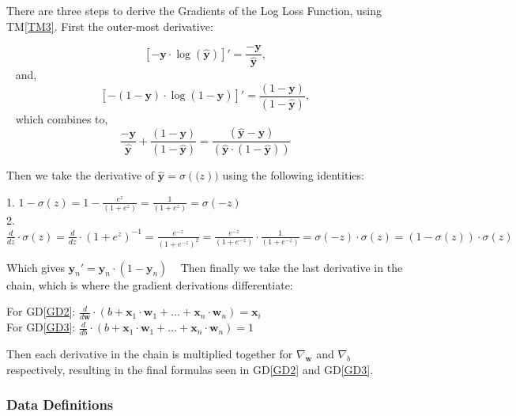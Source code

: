 \documentclass[12pt]{article}
\newcommand{\dref}[1]{GD\ref{#1}}
\newcommand{\tref}[1]{TM\ref{#1}}
\begin{document}
There are three steps to derive the Gradients of the Log Loss Function, using \tref{TM3}. First the outer-most derivative:
\begin{center}
  $$
    [-\mathbf{y} \cdot \log(\mathbf{\hat{y}})]' = \frac{-\mathbf{y}}{\mathbf{\hat{y}}},
  $$
  ~\newline
    and, 
    ~\newline
    $$
    [-(1 - \mathbf{y}) \cdot \log(1 - \mathbf{\hat{y}})]' = \frac{(1 - \mathbf{y})}{(1 - \mathbf{\hat{y}})}, 
    $$
    ~\newline
    which combines to,
    ~\newline
    $$
    \frac{-\mathbf{y}}{\mathbf{\hat{y}}} + \frac{(1 - \mathbf{y})}{(1 - \mathbf{\hat{y}})} = \frac{(\mathbf{\hat{y}} - \mathbf{y})}{(\mathbf{\hat{y}} \cdot (1 - \mathbf{\hat{y}}))}
    $$
\end{center}
Then we take the derivative of $\mathbf{\hat{y}} = \sigma(\mathbf(z))$ using the following identities:
\begin{center}
1. $ 1 - \sigma(z) = 1 - \frac{e^z}{(1 + e^z)} = \frac{1}{(1 + e^z)} = \sigma(-z)$\\
2.$ \frac{d}{dz} \cdot \sigma(z) = \frac{d}{dz} \cdot (1 + e^z)^{-1} = \frac{e^{-z}}{(1 + e^{-z})^2} = \frac{e^{-z}}{(1 + e^{-z})} \cdot \frac{1}{(1 + e^{-z})} = \sigma(-z) \cdot \sigma(z) = (1 - \sigma(z)) \cdot \sigma(z) $
\end{center}
Which gives $ \mathbf{y}_n' = \mathbf{y}_n \cdot (1 - \mathbf{y}_n)$
~\newline
Then finally we take the last derivative in the chain, which is where the gradient derivations differentiate:
\begin{center}
For \dref{GD2}: $ \frac{d}{d\mathbf{w}} \cdot (b + \mathbf{x}_1 \cdot \mathbf{w}_1 + ... +\mathbf{x}_n \cdot \mathbf{w}_n) = \mathbf{x}_i$ \\
For \dref{GD3}: $\frac{d}{db} \cdot (b + \mathbf{x}_1 \cdot \mathbf{w}_1 + ... +\mathbf{x}_n \cdot \mathbf{w}_n) = 1 $
\end{center}

Then each derivative in the chain is multiplied together for $\nabla_\mathbf{w}$ and $\nabla_b$ respectively, resulting in
the final formulas seen in \dref{GD2} and \dref{GD3}. 


\subsubsection{Data Definitions}\label{sec_datadef}
\end{document}
